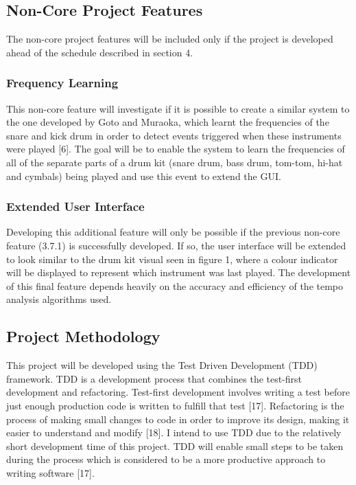 \documentclass[a4paper, 11pt]{article}
\begin{document}
\subsection{Non-Core Project Features}
The non-core project features will be included only if the project is developed ahead of the schedule described in section 4. 

\subsubsection{Frequency Learning}
This non-core feature will investigate if it is possible to create a similar system to the one developed by Goto and Muraoka, which learnt the frequencies of the snare and kick drum in order to detect events triggered when these instruments were played [6]. The goal will be to enable the system to learn the frequencies of all of the separate parts of a drum kit (snare drum, bass drum, tom-tom, hi-hat and cymbals) being played and use this event to extend the GUI.

\subsubsection{Extended User Interface}
Developing this additional feature will only be possible if the previous non-core feature (3.7.1) is successfully developed. If so, the user interface will be extended to look similar to the drum kit visual seen in figure 1, where a colour indicator will be displayed to represent which instrument was last played. The development of this final feature depends heavily on the accuracy and efficiency of the tempo analysis algorithms used.

\subsection{Project Methodology}
This project will be developed using the Test Driven Development (TDD) framework. TDD is a development process that combines the test-first development and refactoring. Test-first development involves writing a test before just enough production code is written to fulfill that test [17]. Refactoring is the process of making small changes to code in order to improve its design, making it easier to understand and modify [18]. I intend to use TDD due to the relatively short development time of this project. TDD will enable small steps to be taken during the process which is considered to be a more productive approach to writing software [17].
\end{document}

